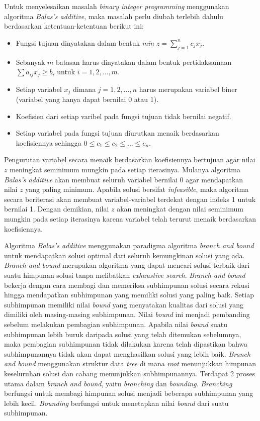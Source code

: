 Untuk menyelesaikan masalah \textit{binary integer programming} menggunakan algoritma \textit{Balas's additive}, maka masalah perlu diubah terlebih dahulu berdasarkan ketentuan-ketentuan berikut ini:

\begin{itemize}
	\item Fungsi tujuan dinyatakan dalam bentuk \textit{min} \(z=\sum_{j=1}^{n}c_jx_j\).
	\item Sebanyak \(m\) batasan harus dinyatakan dalam bentuk pertidaksamaan \(\sum a_{ij} x_j\geq b_i\) untuk \(i=1,2,\dots,m\).
	\item Setiap variabel \(x_j\) dimana \(j=1,2,\dots,n\) harus merupakan variabel biner (variabel yang hanya dapat bernilai 0 atau 1).
	\item Koefisien dari setiap varibel pada fungsi tujuan tidak bernilai negatif.
	\item Setiap variabel pada fungsi tujuan diurutkan menaik berdasarkan koefisiennya sehingga \(0\leq c_1 \leq c_2 \leq \dots \leq c_n\).
\end{itemize}

Pengurutan variabel secara menaik berdasarkan koefisiennya bertujuan agar nilai \(z\) meningkat seminimum mungkin pada setiap iterasinya. Mulanya algoritma \textit{Balas's additive} akan membuat seluruh variabel bernilai 0 agar mendapatkan nilai \(z\) yang paling minimum. Apabila solusi bersifat \textit{infeasible}, maka algoritma secara beriterasi akan membuat variabel-variabel terdekat dengan indeks 1 untuk bernilai 1. Dengan demikian, nilai \(z\) akan meningkat dengan nilai seminimum mungkin pada setiap iterasinya karena variabel telah terurut menaik berdasarkan koefisiennya.

Algoritma \textit{Balas's additive} menggunakan paradigma algoritma \textit{branch and bound}~\cite{narendra1977branch} untuk mendapatkan solusi optimal dari seluruh kemungkinan solusi yang ada. \textit{Branch and bound} merupakan algoritma yang dapat mencari solusi terbaik dari suatu himpunan solusi tanpa melibatkan \textit{exhaustive search}. \textit{Branch and bound} bekerja dengan cara membagi dan memeriksa subhimpunan solusi secara rekusi hingga mendapatkan subhimpunan yang memiliki solusi yang paling baik. Setiap subhimpunan memiliki nilai \textit{bound} yang menyatakan kualitas dari solusi yang dimiliki oleh masing-masing subhimpunan. Nilai \textit{bound} ini menjadi pembanding sebelum melakukan pembagian subhimpunan. Apabila nilai \textit{bound} suatu subhimpunan lebih buruk daripada solusi yang telah ditemukan sebelumnya, maka pembagian subhimpunan tidak dilakukan karena telah dipastikan bahwa subhimpunannya tidak akan dapat menghasilkan solusi yang lebih baik. \textit{Branch and bound} menggunakan struktur data \textit{tree} di mana \textit{root} menunjukkan himpunan keseluruhan solusi dan cabang menunjukkan subhimpunannya. Terdapat 2 proses utama dalam \textit{branch and bound}, yaitu \textit{branching} dan \textit{bounding}. \textit{Branching} berfungsi untuk membagi himpunan solusi menjadi beberapa subhimpunan yang lebih kecil. \textit{Bounding} berfungsi untuk menetapkan nilai \textit{bound} dari suatu subhimpunan.

